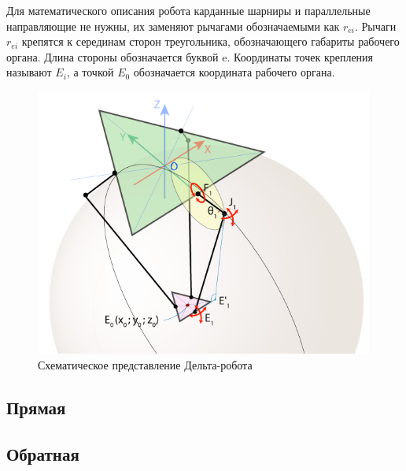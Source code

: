 Для математического описания робота карданные шарниры и параллельные направляющие не нужны, их заменяют рычагами обозначаемыми как $r_{ei}$. Рычаги $r_{ei}$ крепятся к серединам сторон треугольника, обозначающего габариты рабочего органа. Длина стороны обозначается буквой e. Координаты точек крепления называют $E_{i}$, а точкой $E_{0}$ обозначается координата рабочего органа.
\begin{figure}[h!]
	\centering
	\includegraphics[width=0.8\linewidth]{image/deltabot}
	\caption{Схематическое представление Дельта-робота}
	\label{fig:TotalConsumption}
\end{figure}




\subsection{Прямая}
\subsection{Обратная}

